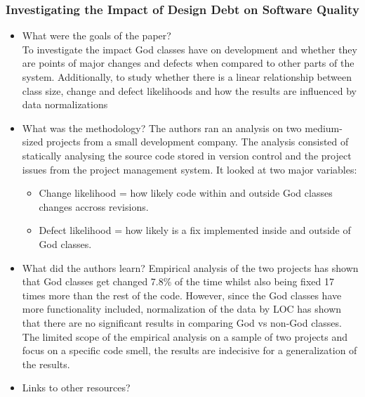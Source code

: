 \documentclass{mprop}
\begin{document}
\subsubsection{Investigating the Impact of Design Debt on Software Quality} \cite{Zazworka2011}
\begin{itemize}
	\item What were the goals of the paper? \\
	To investigate the impact God classes have on development and whether they are points of major changes and defects when compared to other parts of the system. Additionally, to study whether there is a linear relationship between class size, change and defect likelihoods and how the results are influenced by data normalizations

	\item What was the methodology?
	The authors ran an analysis on two medium-sized projects from a small development company. The analysis consisted of statically analysing the source code stored in version control and the project issues from the project management system.
	It looked at two major variables:
		\begin{itemize}
			\item Change likelihood = how likely code within and outside God classes changes accross revisions.
			\item Defect likelihood = how likely is a fix implemented inside and outside of God classes.
		\end{itemize}
	\item What did the authors learn?
	Empirical analysis of the two projects has shown that God classes get changed 7.8\% of the time whilst also being fixed 17 times more than the rest of the code.
	However, since the God classes have more functionality included, normalization of the data by LOC has shown that there are no significant results in comparing God vs non-God classes.
	The limited scope of the empirical analysis on a sample of two projects and focus on a specific code smell, the results are indecisive for a generalization of the results.
	\item Links to other resources?
\end{itemize}
\end{document}
